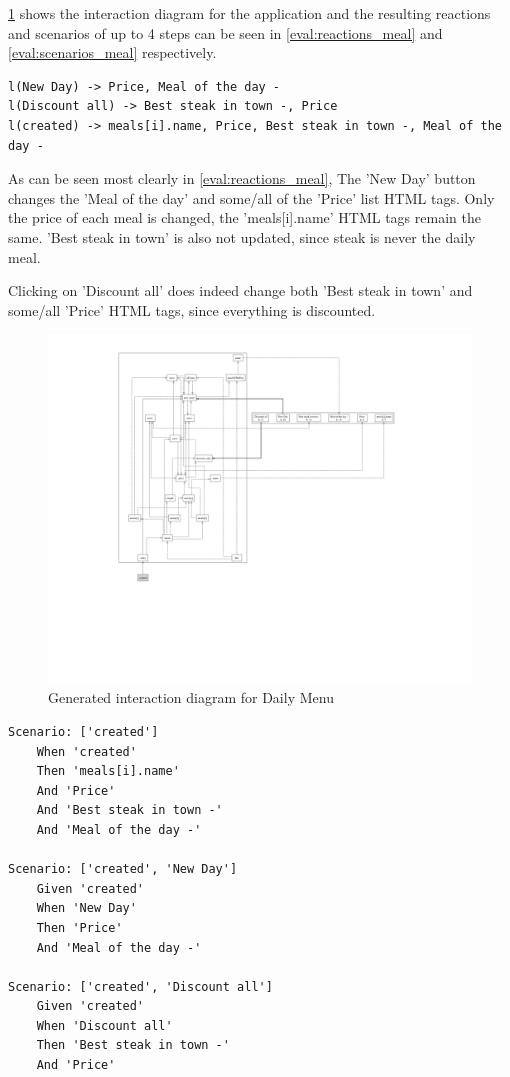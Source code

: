 \ref{fig:diagram_meal_list_properties} shows the interaction diagram for the application and the resulting reactions and scenarios of up to 4 steps can be seen in \ref{eval:reactions_meal} and \ref{eval:scenarios_meal} respectively.

\label{eval:reactions_meal}
\begin{lstlisting}
l(New Day) -> Price, Meal of the day -
l(Discount all) -> Best steak in town -, Price
l(created) -> meals[i].name, Price, Best steak in town -, Meal of the day -
\end{lstlisting}

As can be seen most clearly in \ref{eval:reactions_meal}, The 'New Day' button changes the 'Meal of the day' and some/all of the 'Price' list HTML tags. Only the price of each meal is changed, the 'meals[i].name' HTML tags remain the same. 'Best steak in town' is also not updated, since steak is never the daily meal. 

Clicking on 'Discount all' does indeed change both 'Best steak in town' and some/all 'Price' HTML tags, since everything is discounted.

\begin{figure}[H]
    \includegraphics[width=\textwidth]{images/diagram_meal.png}
     \caption{Generated interaction diagram for Daily Menu}
     \label{fig:diagram_meal_list_properties}
\end{figure}

\label{eval:scenarios_meal}
\begin{lstlisting}
Scenario: ['created']
	When 'created'
	Then 'meals[i].name'
	And 'Price'
	And 'Best steak in town -'
	And 'Meal of the day -'

Scenario: ['created', 'New Day']
	Given 'created'
	When 'New Day'
	Then 'Price'
	And 'Meal of the day -'

Scenario: ['created', 'Discount all']
	Given 'created'
	When 'Discount all'
	Then 'Best steak in town -'
	And 'Price'
\end{lstlisting}





